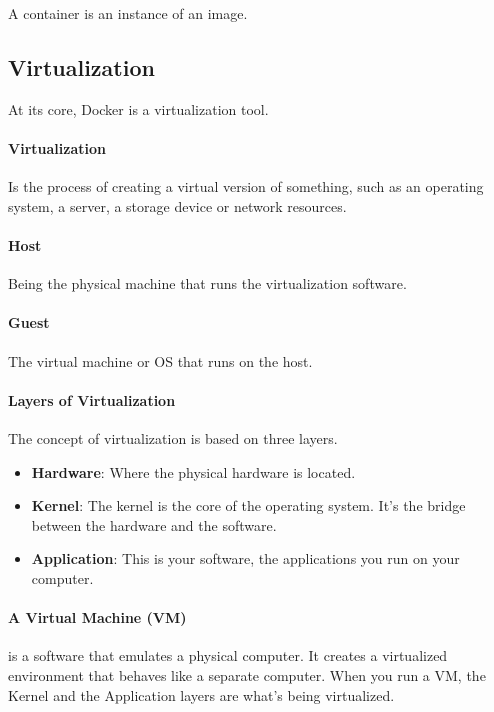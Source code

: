 \documentclass[a4paper]{article}
\begin{document}
    A container is an instance of an image.

    \subsection{Virtualization}

    At its core, Docker is a virtualization tool. 

    \paragraph*{Virtualization} Is the process of creating a virtual version of something, such as an operating system, a server, a storage device or network resources. 

    \paragraph{Host} Being the physical machine that runs the virtualization software.

    \paragraph{Guest} The virtual machine or OS that runs on the host.
    

    \paragraph{Layers of Virtualization} The concept of virtualization is based on three layers.
    \begin{itemize}
        \item \textbf{Hardware}: Where the physical hardware is located. 
        \item \textbf{Kernel}: The kernel is the core of the operating system. It's the bridge between the hardware and the software.
        \item \textbf{Application}: This is your software, the applications you run on your computer.
    \end{itemize}

    \paragraph{A Virtual Machine (VM)} is a software that emulates a physical computer. It creates a virtualized environment that behaves like a separate computer. When you run a VM, the Kernel and the Application layers are what's being virtualized.
\end{document}
